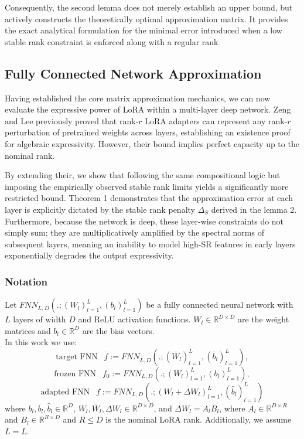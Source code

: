 \documentclass[a4paper,14pt]{extarticle}
\begin{document}
    Consequently, the second lemma does not merely establish an upper bound, but actively constructs the theoretically optimal approximation matrix. It provides the exact analytical formulation for the minimal error introduced when a low stable rank constraint is enforced along with a regular rank
       

  
    \subsection{Fully Connected Network Approximation}

    Having established the core matrix approximation mechanics, we can now evaluate the expressive power of LoRA within a multi-layer deep network. Zeng and Lee \cite{zeng2024expressivepowerlowrankadaptation} previously proved that rank-$r$ LoRA adapters can represent any rank-$r$ perturbation of pretrained weights across layers, establishing an existence proof for algebraic expressivity. However, their bound implies perfect capacity up to the nominal rank. 
    
    By extending their, we show that following the same compositional logic but imposing the empirically observed stable rank limits yields a significantly more restricted bound. Theorem 1 demonstrates that the approximation error at each layer is explicitly dictated by the stable rank penalty $\Delta_S$ derived in the lemma 2. Furthermore, because the network is deep, these layer-wise constraints do not simply sum; they are multiplicatively amplified by the spectral norms of subsequent layers, meaning an inability to model high-SR features in early layers exponentially degrades the output expressivity.

    
    \subsubsection{Notation}
    
    Let $FNN_{L,D}(.;(W_l)_{l=1}^L, (b_l)_{l=1}^L)$ be a fully connected neural network with $L$ layers of width $D$ and ReLU activation functions. $W_l\in \mathbb{R}^{D\times D}$ are the weight matrices and $b_l\in \mathbb{R}^D$ are the bias vectors.\\ 
    In this work we use:
    $$\text{target FNN  }~~ \overline{f}:=FNN_{\overline{L},D}(.;(\overline{W}_l)_{l=1}^L, (\overline{b}_l)_{l=1}^L), $$ 
    $$\text{frozen FNN }~~ f_0:= FNN_{L,D}(.;(W_l)_{l=1}^L, (b_l)_{l=1}^L),$$
    $$\text{adapted FNN }~~ f:=FNN_{L,D}(.;(W_l + \Delta W_l)_{l=1}^L, (\hat{b}_l)_{l=1}^L)$$
    where $b_l, \overline{b}_l, \hat{b}_l \in \mathbb{R}^D$, $W_l, \overline{W}_l, \Delta W_l \in \mathbb{R}^{D\times D}$, and $\Delta W_l = A_l B_l$, where $A_l\in \mathbb{R}^{D\times R}$ and $B_l\in \mathbb{R}^{R\times D}$ and $R\leqslant D$ is the nominal LoRA rank. Additionally, we assume $\overline{L} = L$.  
\end{document}
